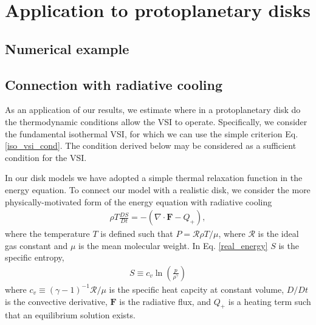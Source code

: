 \section{Application to protoplanetary disks}\label{application} 

\subsection{Numerical example}






\subsection{Connection with radiative cooling}
As an application of our results, we estimate where in a 
protoplanetary disk do the thermodynamic conditions allow the VSI to 
operate. Specifically, we consider the fundamental isothermal VSI, 
for which we can use the simple criterion Eq. \ref{iso_vsi_cond}. The
condition derived below may be considered as a sufficient condition for the VSI.  

In our disk models we have adopted a simple thermal relaxation
function in the energy equation. To connect our model with a realistic
disk, we consider the more physically-motivated form of the energy
equation with radiative cooling 
\begin{align}\label{real_energy}
\rho T \frac{DS}{Dt} = - \left(\nabla\cdot\bm{F} - Q_+\right), 
\end{align}
where the temperature $T$ is defined such that $P=\mathcal{R}\rho
T/\mu$, where $\mathcal{R}$ is the ideal gas constant and $\mu$ is
the mean molecular weight. In Eq. \ref{real_energy} $S$ is the
specific entropy,
\begin{align}
  S \equiv c_v\ln{\left(\frac{p}{\rho^{\gamma}}\right)} 
\end{align}
where $c_v \equiv \left(\gamma-1\right)^{-1}\mathcal{R}/\mu$ is the specific heat capcity at
constant volume, $D/Dt$ is the convective derivative, $\bm{F}$ is the
radiative flux, and $Q_+$ is a heating term such that an equilibrium
solution exists.  

